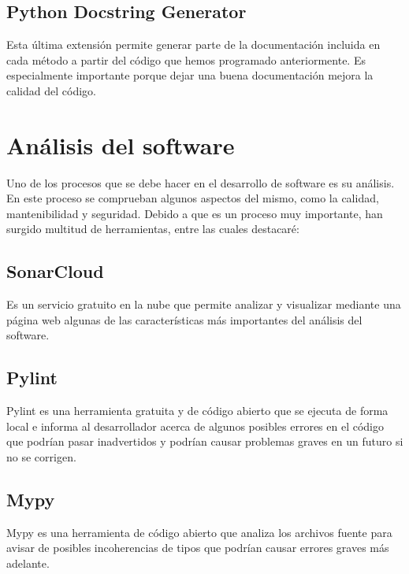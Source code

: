 \subsection{Python Docstring Generator}
Esta última extensión permite generar parte de la documentación incluida en cada método a partir del código que hemos programado anteriormente. Es especialmente importante porque dejar una buena documentación mejora la calidad del código.

\section{Análisis del software}
Uno de los procesos que se debe hacer en el desarrollo de software es su análisis. En este proceso se comprueban algunos aspectos del mismo, como la calidad, mantenibilidad y seguridad. Debido a que es un proceso muy importante, han surgido multitud de herramientas, entre las cuales destacaré:
\subsection{SonarCloud}
Es un servicio gratuito en la nube que permite analizar y visualizar mediante una página web algunas de las características más importantes del análisis del software.
\subsection{Pylint}
Pylint \cite{pylint} es una herramienta gratuita y de código abierto que se ejecuta de forma local e informa al desarrollador acerca de algunos posibles errores en el código que podrían pasar inadvertidos y podrían causar problemas graves en un futuro si no se corrigen.
\subsection{Mypy}
Mypy \cite{mypy} es una herramienta de código abierto que analiza los archivos fuente para avisar de posibles incoherencias de tipos que podrían causar errores graves más adelante.